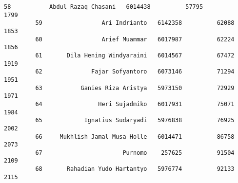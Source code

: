 \documentclass[11pt]{article}
\begin{document}
\begin{Verbatim}[commandchars=\\\{\}]
         58           Abdul Razaq Chasani   6014438          57795              1799   
         59                 Ari Indrianto   6142358          62088              1853   
         60                 Arief Muammar   6017987          62224              1856   
         61       Dila Hening Windyaraini   6014567          67472              1919   
         62              Fajar Sofyantoro   6073146          71294              1951   
         63           Ganies Riza Aristya   5973150          72929              1971   
         64                Heri Sujadmiko   6017931          75071              1984   
         65            Ignatius Sudaryadi   5976838          76925              2002   
         66     Mukhlish Jamal Musa Holle   6014471          86758              2073   
         67                       Purnomo    257625          91504              2109   
         68       Rahadian Yudo Hartantyo   5976774          92133              2115   
         

\end{Verbatim}
\end{document}

